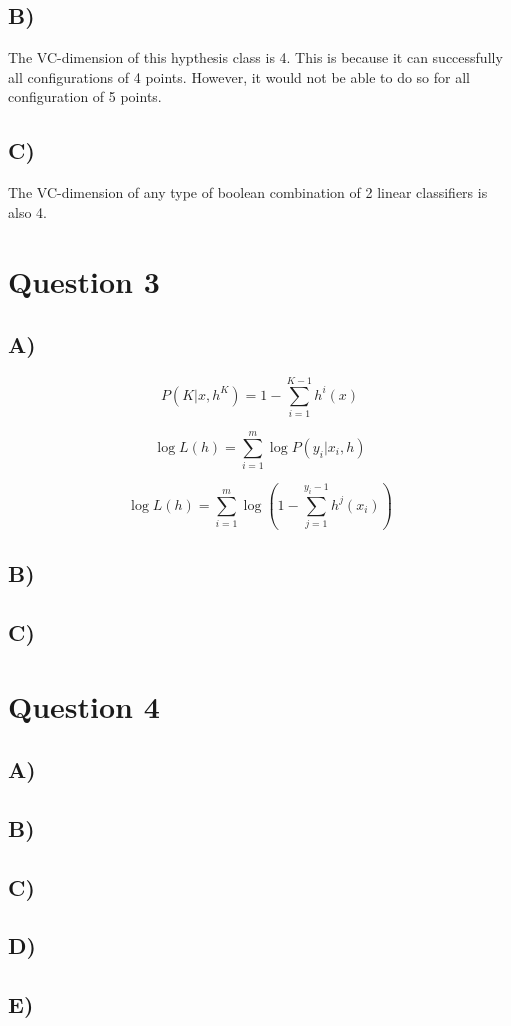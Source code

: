 \documentclass{report}
\begin{document}
\subsection*{B)}
The VC-dimension of this hypthesis class is 4. This is because it can successfully
all configurations of 4 points. However, it would not be able to do so for all
configuration of 5 points.
\subsection*{C)}
The VC-dimension of any type of boolean combination of 2 linear classifiers is
also 4.

\section*{Question 3}
\subsection*{A)}
\begin{equation}
  P(K | x, h^K) = 1-\sum_{i=1}^{K-1} h^i(x)
\end{equation}

\begin{equation}
  \log L (h) = \sum_{i=1}^{m}
  \log P(y_i | x_i, h)
\end{equation}

\begin{equation}
  \log L (h) = \sum_{i=1}^{m} \log
  \left(
  1-\sum_{j=1}^{y_i-1}h^j(x_i)
  \right)
\end{equation}

\subsection*{B)}
\subsection*{C)}

\section*{Question 4}
\subsection*{A)}
\subsection*{B)}
\subsection*{C)}
\subsection*{D)}
\subsection*{E)}
\end{document}

